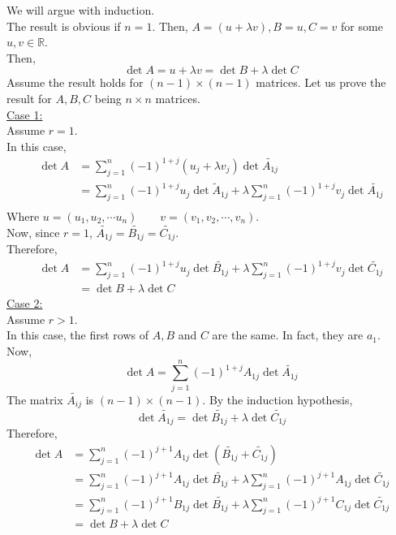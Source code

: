 \documentclass[12pt]{article}
\begin{document}
\begin{prf}{}
We will argue with induction.\\
The result is obvious if \(n = 1\). Then, \(A = (u + \lambda v), B = u,  C = v\) for some \(u, v \in \mathbb R\).\\
Then, \[\det A = u + \lambda v = \det B + \lambda \det C\]
Assume the result holds for \((n-1)\times (n-1)\) matrices. Let us prove the result for \(A, B, C\) being \(n\times n\) matrices.\\
\underline{Case 1:}\\
Assume \(r = 1\).\\
In this case, 
\begin{align*}
\det A &= \displaystyle\sum_{j = 1}^n (-1)^{1+j} (u_j + \lambda v_j)\det\tilde{A_{1j}}\\
&= \displaystyle\sum_{j=1}^n (-1)^{1+j}u_j \det \tilde{A}_{1j} + \lambda\displaystyle\sum_{j=1}^n(-1)^{1+j}v_j \det \tilde{A_{1j}}\\
\end{align*}
Where \(u = (u_1, u_2, \cdots u_n)\qquad v = (v_1, v_2, \cdots, v_n)\).\\
Now, since \(r = 1\), \(\tilde{A_{1j}} = \tilde{B_{1j}} = \tilde{C_{1j}}\).\\
Therefore, 
\begin{align*}
\det A &= \displaystyle\sum_{j = 1}^n (-1)^{1+j} u_j \det \tilde{B_{1j}} + \lambda\displaystyle\sum_{j = 1}^n (-1)^{1+j} v_j \det \tilde{C_{1j}}\\
&= \det B + \lambda\det C
\end{align*}
\underline{Case 2:}\\
Assume \(r > 1\).\\
In this case, the first rows of \(A, B\) and \(C\) are the same. In fact, they are \(a_1\).\\
Now, \[\det A = \displaystyle\sum_{j=1}^n (-1)^{1+j}A_{1j}\det\tilde{A_{1j}}\]
The matrix \(\tilde{A_{ij}}\) is \((n-1)\times (n-1)\). By the induction hypothesis, \[\det \tilde{A_{1j}} = \det \tilde{B_{1j}} + \lambda\det\tilde{C_{1j}}\]
Therefore,
\begin{align*}
    \det A &= \displaystyle\sum_{j=1}^n (-1)^{j+1} A_{1j}\det\left(\tilde{B_{1j}}+ \tilde{C_{1j}}\right)\\
    &= \displaystyle\sum_{j=1}^n (-1)^{j+1} A_{1j}\det\tilde{B_{1j}} + \lambda\displaystyle\sum_{j=1}^n (-1)^{j+1} A_{1j}\det\tilde{C_{1j}}\\
    &= \displaystyle\sum_{j=1}^n (-1)^{j+1} B_{1j}\det\tilde{B_{1j}} + \lambda\displaystyle\sum_{j=1}^n (-1)^{j+1} C_{1j}\det\tilde{C_{1j}}\\
    &= \det B + \lambda \det C
\end{align*}
\end{prf}
\end{document}
